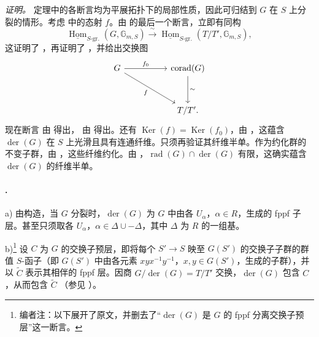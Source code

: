 \textit{证明。}
定理中的各断言均为平展拓扑下的局部性质，因此可归结到 \(G\) 在 \(S\) 上分裂的情形。考虑  中的态射 \(f\)。由  的最后一个断言，立即有同构
\[
  \underline{\operatorname{Hom}}_{S\text{-gr.}}
    (G,\mathbb G_{m,S})
  \xrightarrow{\ \sim\ }
  \underline{\operatorname{Hom}}_{S\text{-gr.}}
    (T/T',\mathbb G_{m,S}),
\]
这证明了 \textup{}，再证明了 \textup{}，并给出交换图
\[
\begin{tikzcd}[column sep=5.0em,row sep=3.2em]
  G
    \arrow[r,"f_0"]
    \arrow[dr,"f"']
  &
  \operatorname{corad}(G)
    \arrow[d,"\sim"]
  \\
  &
  T/T'.
\end{tikzcd}
\]
现在断言 \textup{} 由  得出，\textup{} 由  得出。还有 \(\operatorname{Ker}(f)=\operatorname{Ker}(f_0)\)，由 ，这蕴含 \(\operatorname{der}(G)\) 在 \(S\) 上光滑且具有连通纤维。只须再验证其纤维半单。作为约化群的不变子群，由 ，这些纤维约化。由 \textup{}，\(\operatorname{rad}(G)\cap\operatorname{der}(G)\) 有限，这确实蕴含 \(\operatorname{der}(G)\) 的纤维半单。

\paragraph{.}
\textup{a)} 由构造，当 \(G\) 分裂时，\(\operatorname{der}(G)\) 为 \(G\) 中由各 \(U_\alpha\)，\(\alpha\in R\)，生成的 fppf 子层。甚至只须取各 \(U_\alpha\)，\(\alpha\in\Delta\cup-\Delta\)，其中 \(\Delta\) 为 \(R\) 的一组基。

\textup{b)}\footnote{编者注：以下展开了原文，并删去了“\(\operatorname{der}(G)\) 是 \(G\) 的 fppf 分离交换子预层”这一断言。}
设 \(C\) 为 \(G\) 的交换子预层，即将每个 \(S'\to S\) 映至 \(G(S')\) 的交换子子群的群值 \(S\)-函子（即 \(G(S')\) 中由各元素 \(xyx^{-1}y^{-1}\)，\(x,y\in G(S')\)，生成的子群），并以 \(\widetilde C\) 表示其相伴的 fppf 层。因商 \(G/\operatorname{der}(G)=T/T'\) 交换，\(\operatorname{der}(G)\) 包含 \(C\)，从而包含 \(\widetilde C\) \textup{（参见 ）}。

